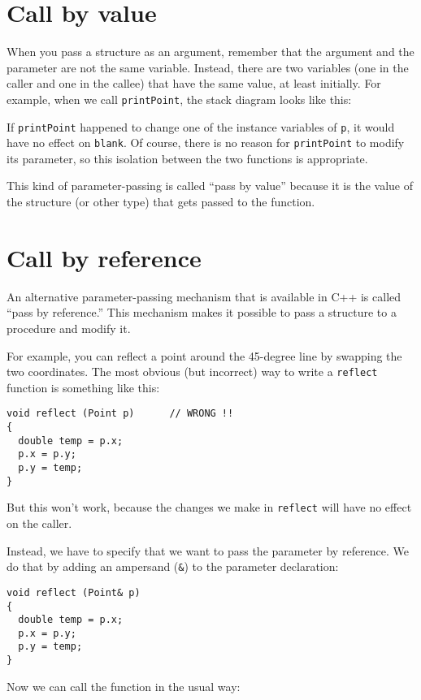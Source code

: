 \section{Call by value}

When you pass a structure as an argument, remember that the
argument and the parameter are not the same variable.  Instead,
there are two variables (one in the caller and one in the
callee) that have the same value, at least initially.  For
example, when we call {\tt printPoint}, the stack diagram
looks like this:

\vspace{0.1in}
\centerline{}
\vspace{0.1in}
%
If {\tt printPoint} happened to change one of the instance variables
of {\tt p}, it would have no effect on {\tt blank}.  Of course, there
is no reason for {\tt printPoint} to modify its parameter, so this
isolation between the two functions is appropriate.

This kind of parameter-passing is called ``pass by value''
because it is the value of the structure (or other type) that
gets passed to the function.

\section{Call by reference}

An alternative parameter-passing mechanism that is available
in C++ is called ``pass by reference.''  This mechanism makes
it possible to pass a structure to a procedure and modify it.

For example, you can reflect a point around the 45-degree line by
swapping the two coordinates.  The most obvious (but incorrect) way to
write a {\tt reflect} function is something like this:

\begin{verbatim}
void reflect (Point p)      // WRONG !!
{
  double temp = p.x;
  p.x = p.y;
  p.y = temp;
}
\end{verbatim}
%
But this won't work, because the changes we make in {\tt reflect}
will have no effect on the caller.

Instead, we have to specify that we want to pass the parameter by
reference.  We do that by adding an ampersand ({\tt \&}) to the
parameter declaration:

\begin{verbatim}
void reflect (Point& p)
{
  double temp = p.x;
  p.x = p.y;
  p.y = temp;
}
\end{verbatim}
%
Now we can call the function in the usual way:

